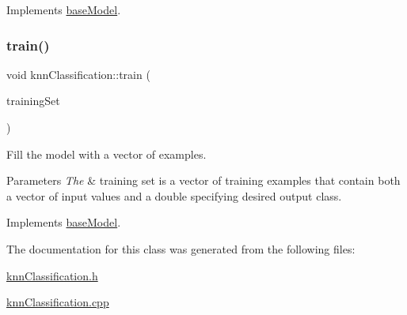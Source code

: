 Implements \hyperlink{classbase_model_a95ef1dffc2857cdd1a57c23f5f9ee2d1}{base\+Model}.

\mbox{\label{classknn_classification_a04ce32741a132d39839d33d0d79e6c8f}} 
\subsubsection{\texorpdfstring{train()}{train()}}
{\footnotesize\ttfamily void knn\+Classification\+::train (\begin{DoxyParamCaption}\item[{const std\+::vector$<$ \hyperlink{structtraining_example}{training\+Example} $>$ \&}]{training\+Set }\end{DoxyParamCaption})\hspace{0.3cm}{\ttfamily [virtual]}}

Fill the model with a vector of examples.


\begin{DoxyParams}{Parameters}
{\em The} & training set is a vector of training examples that contain both a vector of input values and a double specifying desired output class. \\
\hline
\end{DoxyParams}


Implements \hyperlink{classbase_model_ab6cbd549d6742029ab9768bc88467b4f}{base\+Model}.



The documentation for this class was generated from the following files\+:\begin{DoxyCompactItemize}
\item 
\hyperlink{knn_classification_8h}{knn\+Classification.\+h}\item 
\hyperlink{knn_classification_8cpp}{knn\+Classification.\+cpp}\end{DoxyCompactItemize}
